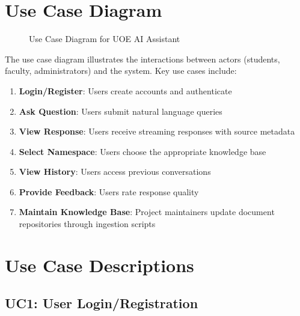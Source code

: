 \documentclass[12pt,a4paper]{book}
\numberwithin{table}{chapter}
\numberwithin{figure}{chapter}
\numberwithin{equation}{chapter}
\begin{document}
\section{Use Case Diagram}

\begin{figure}[h]
\centering
\caption{Use Case Diagram for UOE AI Assistant}
\label{fig:use_case}
\end{figure}

The use case diagram illustrates the interactions between actors (students, faculty, administrators) and the system. Key use cases include:

\begin{enumerate}
    \item \textbf{Login/Register}: Users create accounts and authenticate
    \item \textbf{Ask Question}: Users submit natural language queries
    \item \textbf{View Response}: Users receive streaming responses with source metadata
    \item \textbf{Select Namespace}: Users choose the appropriate knowledge base
    \item \textbf{View History}: Users access previous conversations
    \item \textbf{Provide Feedback}: Users rate response quality
    \item \textbf{Maintain Knowledge Base}: Project maintainers update document repositories through ingestion scripts
\end{enumerate}

\section{Use Case Descriptions}

\subsection{UC1: User Login/Registration}
\end{document}
